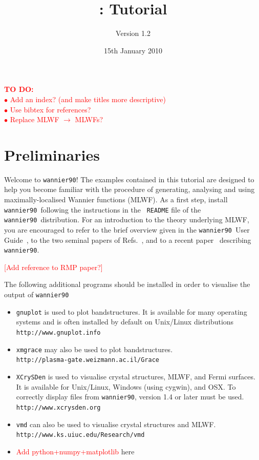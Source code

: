 \documentclass[a4paper,11pt,twoside]{article}
\title{\wannier: Tutorial}
\author{Version 1.2}
\date{15th January 2010}
\def\tent#1{\textcolor{red}{#1}}     %
\begin{document}
\newcommand{\wannier}{{\rm\texttt{wannier90}}}
\newcommand{\postw}{{\rm\texttt{postw90}}}
\newcommand{\bw}{{\rm\texttt{BoltzWann}}}
\newcommand{\pwscf}{\textsc{pwscf}}
\newcommand{\QE}{\textsc{quantum-espresso}}
\newcommand{\Mkb}{\mathbf{M}^{(\mathbf{k},\mathbf{b})}}
\newcommand{\Ak}{\mathbf{A}^{(\mathbf{k})}}
\newcommand{\Uk}{\mathbf{U}^{(\mathbf{k})}}

\maketitle

\tent{
{\bf TO DO:}\\
$\bullet$ Add an index? (and make titles more descriptive)\\
$\bullet$ Use bibtex for references?\\
$\bullet$ Replace MLWF $\rightarrow$ MLWFs?
}

\section*{Preliminaries}

Welcome to \wannier! The examples contained in this tutorial are
designed to help you become familiar with the procedure of generating,
analysing and using maximally-localised Wannier functions (MLWF). As a
first step, install \wannier\ following the instructions in the {\tt
  README} file of the \wannier\ distribution.  For an introduction to
the theory underlying MLWF, you are encouraged to refer to the brief
overview given in the \wannier\ User Guide~\cite{UserGuide}, to the
two seminal papers of Refs.~\cite{MV,SMV}, and to a recent
paper~\cite{W90} describing \wannier.

\tent{[Add reference to RMP paper?]}

The following additional programs should be installed in order to
visualise the output of \wannier\ 
\begin{itemize}
\item {\tt gnuplot} is used to plot bandstructures. It is 
available for many operating systems and is often installed by default on
 Unix/Linux distributions\\
{\tt http://www.gnuplot.info}
\item {\tt xmgrace} may also be used to plot bandstructures.\\
{\tt http://plasma-gate.weizmann.ac.il/Grace}
\item {\tt XCrySDen} is used to visualise crystal structures, MLWF,
  and Fermi surfaces. It is available for Unix/Linux, 
  Windows (using cygwin), and OSX. To correctly display 
files from \wannier, version 1.4 or later must be used.\\
{\tt http://www.xcrysden.org}
\item {\tt vmd} can also be used to visualise crystal structures and
  MLWF.\\
{\tt http://www.ks.uiuc.edu/Research/vmd}
\item{\tent{Add python+numpy+matplotlib} here}
\end{itemize}
\end{document}
